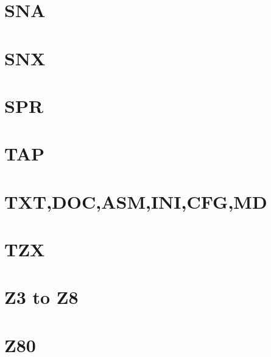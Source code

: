 \section{SNA}
\section{SNX}
\section{SPR}
\section{TAP}
\section{TXT,DOC,ASM,INI,CFG,MD}
\section{TZX}
\section{Z3 to Z8}
\section{Z80}
